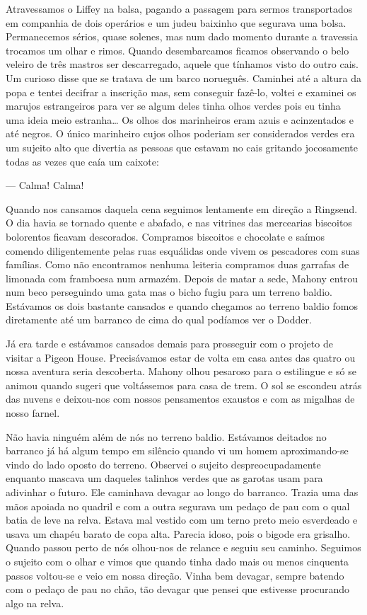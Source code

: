Atravessamos o Liffey na balsa, pagando a passagem para sermos transportados em
companhia de dois operários e um judeu baixinho que segurava uma bolsa.
Permanecemos sérios, quase solenes, mas num dado momento durante a travessia
trocamos um olhar e rimos.  Quando desembarcamos ficamos observando o belo
veleiro de três mastros ser descarregado, aquele que tínhamos visto do outro
cais.  Um curioso disse que se tratava de um barco norueguês.  Caminhei até a
altura da popa e tentei decifrar a inscrição mas, sem conseguir fazê-lo, voltei
e examinei os marujos estrangeiros para ver se algum deles tinha olhos verdes
pois eu tinha uma ideia meio estranha\ldots{} Os olhos dos marinheiros eram
azuis e acinzentados e até negros.  O único marinheiro cujos olhos poderiam ser
considerados verdes era um sujeito alto que divertia as pessoas que estavam no
cais gritando jocosamente todas as vezes que caía um caixote:

--- Calma!  Calma!

Quando nos cansamos daquela cena seguimos lentamente em direção a Ringsend.  O dia
havia se tornado quente e abafado, e nas vitrines das mercearias biscoitos
bolorentos ficavam descorados.  Compramos biscoitos e chocolate e saímos
comendo diligentemente pelas ruas esquálidas onde vivem os pescadores com suas
famílias.  Como não encontramos nenhuma leiteria compramos duas garrafas de
limonada com framboesa num armazém.  Depois de matar a sede, Mahony entrou num
beco perseguindo uma gata mas o bicho fugiu para um terreno baldio.  Estávamos
os dois bastante cansados e quando chegamos ao terreno baldio fomos diretamente
até um barranco de cima do qual podíamos ver o Dodder.

Já era tarde e estávamos cansados demais para prosseguir com o projeto de
visitar a Pigeon House.  Precisávamos estar de volta em casa antes das quatro
ou nossa aventura seria descoberta.  Mahony olhou pesaroso para o estilingue e
só se animou quando sugeri que voltássemos para casa de trem.  O sol se
escondeu atrás das nuvens e deixou-nos com nossos pensamentos exaustos e com as
migalhas de nosso farnel.

Não havia ninguém além de nós no terreno baldio.  Estávamos deitados no
barranco já há algum tempo em silêncio quando vi um homem aproximando-se vindo
do lado oposto do terreno.  Observei o sujeito despreocupadamente enquanto
mascava um daqueles talinhos verdes que as garotas usam para adivinhar o
futuro.  Ele caminhava devagar ao longo do barranco.  Trazia uma das mãos
apoiada no quadril e com a outra segurava um pedaço de pau com o qual batia de
leve na relva.  Estava mal vestido com um terno preto meio esverdeado e usava
um chapéu barato de copa alta.  Parecia idoso, pois o bigode era grisalho.
Quando passou perto de nós olhou-nos de relance e seguiu seu caminho.  Seguimos
o sujeito com o olhar e vimos que quando tinha dado mais ou menos cinquenta
passos voltou-se e veio em nossa direção.  Vinha bem devagar, sempre batendo
com o pedaço de pau no chão, tão devagar que pensei que estivesse procurando
algo na relva.

